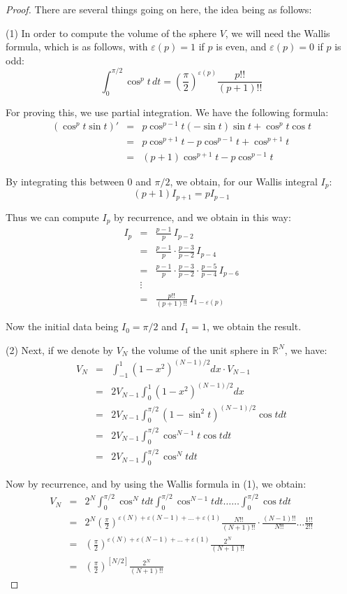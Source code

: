 \documentclass[12pt]{amsbook}
\begin{document}
\begin{proof}
There are several things going on here, the idea being as follows:

\medskip

(1) In order to compute the volume of the sphere $V$, we will need the Wallis formula, which is as follows, with $\varepsilon(p)=1$ if $p$ is even, and $\varepsilon(p)=0$ if $p$ is odd:
$$\int_0^{\pi/2}\cos^pt\,dt=\left(\frac{\pi}{2}\right)^{\varepsilon(p)}\frac{p!!}{(p+1)!!}$$

For proving this, we use partial integration. We have the following formula:
\begin{eqnarray*}
(\cos^pt\sin t)'
&=&p\cos^{p-1}t(-\sin t)\sin t+\cos^pt\cos t\\
&=&p\cos^{p+1}t-p\cos^{p-1}t+\cos^{p+1}t\\
&=&(p+1)\cos^{p+1}t-p\cos^{p-1}t
\end{eqnarray*}

By integrating this between $0$ and $\pi/2$, we obtain, for our Wallis integral $I_p$:
$$(p+1)I_{p+1}=pI_{p-1}$$

Thus we can compute $I_p$ by recurrence, and we obtain in this way:
\begin{eqnarray*}
I_p
&=&\frac{p-1}{p}\,I_{p-2}\\
&=&\frac{p-1}{p}\cdot\frac{p-3}{p-2}\,I_{p-4}\\
&=&\frac{p-1}{p}\cdot\frac{p-3}{p-2}\cdot\frac{p-5}{p-4}\,I_{p-6}\\
&\vdots&\\
&=&\frac{p!!}{(p+1)!!}\,I_{1-\varepsilon(p)}
\end{eqnarray*}

Now the initial data being $I_0=\pi/2$ and $I_1=1$, we obtain the result. 

\medskip

(2) Next, if we denote by $V_N$ the volume of the unit sphere in $\mathbb R^N$, we have:
\begin{eqnarray*}
V_N
&=&\int_{-1}^1(1-x^2)^{(N-1)/2}dx\cdot V_{N-1}\\
&=&2V_{N-1}\int_0^1(1-x^2)^{(N-1)/2}dx\\
&=&2V_{N-1}\int_0^{\pi/2}(1-\sin^2 t)^{(N-1)/2}\cos tdt\\
&=&2V_{N-1}\int_0^{\pi/2}\cos^{N-1}t\cos tdt\\
&=&2V_{N-1}\int_0^{\pi/2}\cos^Ntdt
\end{eqnarray*}

Now by recurrence, and by using the Wallis formula in (1), we obtain:
\begin{eqnarray*}
V_N
&=&2^N\int_0^{\pi/2}\cos^Ntdt\int_0^{\pi/2}\cos^{N-1}tdt\ldots\ldots\int_0^{\pi/2}\cos tdt\\
&=&2^N\left(\frac{\pi}{2}\right)^{\varepsilon(N)+\varepsilon(N-1)+\ldots+\varepsilon(1)}\frac{N!!}{(N+1)!!}\cdot\frac{(N-1)!!}{N!!}\ldots\frac{1!!}{2!!}\\
&=&\left(\frac{\pi}{2}\right)^{\varepsilon(N)+\varepsilon(N-1)+\ldots+\varepsilon(1)}\frac{2^N}{(N+1)!!}\\
&=&\left(\frac{\pi}{2}\right)^{[N/2]}\frac{2^N}{(N+1)!!}
\end{eqnarray*}


\end{proof}
\end{document}
